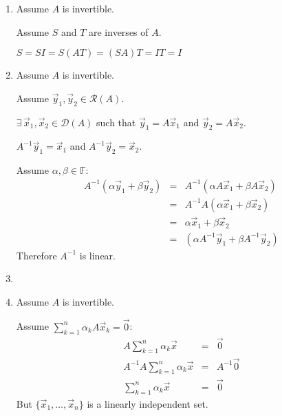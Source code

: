 \documentclass[letterpaper,12pt,fleqn]{article}
\newcommand{\md}{\mathcal{D}}
\newcommand{\mr}{\mathcal{R}}
\newcommand{\vx}{\vec{x}}
\newcommand{\vy}{\vec{y}}
\newcommand{\vo}{\vec{0}}
\newcommand{\F}{\mathbb{F}}
\renewcommand{\a}{\alpha}
\renewcommand{\b}{\beta}
\begin{document}
\begin{theproof}
  \listbreak
  \begin{enumerate}
  \item Assume $A$ is invertible.
    
    Assume $S$ and $T$ are inverses of $A$.

    $S=SI=S(AT)=(SA)T=IT=I$

  \item Assume $A$ is invertible.

    Assume $\vy_1,\vy_2\in\mr(A)$.
    
    $\exists\,\vx_1,\vx_2\in\md(A)$ such that $\vy_1=A\vx_1$ and
    $\vy_2=A\vx_2$.
    
    $A^{-1}\vy_1=\vx_1$ and $A^{-1}\vy_2=\vx_2$.
    
    Assume $\a,\b\in\F$:
    \begin{eqnarray*}
      A^{-1}(\a\vy_1+\b\vy_2) &=& A^{-1}(\a A\vx_1+\b A\vx_2) \\
      &=& A^{-1}A(\a\vx_1+\b\vx_2) \\
      &=& \a\vx_1+\b\vx_2 \\
      &=& (\a A^{-1}\vy_1+\b A^{-1}\vy_2)
    \end{eqnarray*}
    Therefore $A^{-1}$ is linear.

  \item

  \item Assume $A$ is invertible.

    Assume $\sum_{k=1}^n\a_kA\vx_k=\vo$:
    \begin{eqnarray*}
      A\sum_{k=1}^n\a_k\vx &=& \vo \\
      A^{-1}A\sum_{k=1}^n\a_k\vx &=& A^{-1}\vo \\
      \sum_{k=1}^n\a_k\vx &=& \vo
    \end{eqnarray*}
    But $\{\vx_1,\ldots,\vx_n\}$ is a linearly independent set.


\end{enumerate}
\end{theproof}
\end{document}
